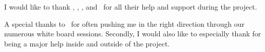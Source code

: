 \vskip 1cm
I would like to thank \FIRSTADVISOR, \SECONDMEMBER, \CHAIRPERSON, and \THIRDMEMBER\ for all their help and support during the project.

A special thanks to \SECONDMEMBER\ for often pushing me in the right direction through our numerous white board sessions.
Secondly, I would also like to especially thank \FIRSTADVISOR for being a major help inside and outside of the project.

\vskip 2cm
\noindent \AUTHOR \\
\PLACE \\
\DATE
